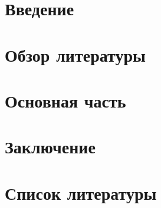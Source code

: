 \documentclass[a4paper,14pt]{extarticle}
\begin{document}


\newpage

{
	\hypersetup{linkcolor=black}
    \tableofcontents
}

\newpage



\newpage

\section{Введение}


\newpage

\section{Обзор литературы}


\newpage

\section{Основная часть}


\newpage

\section{Заключение}


\newpage

\section{Список литературы}

\end{document}
